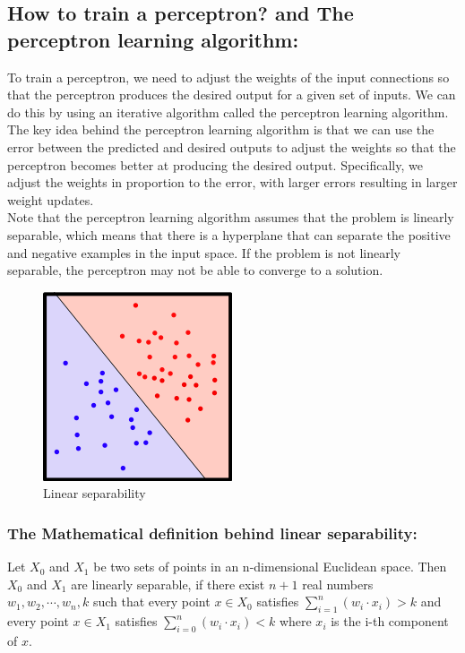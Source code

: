 \documentclass[12pt]{article}
\begin{document}
\subsection{How to train a perceptron? and The perceptron learning algorithm:}
To train a perceptron, we need to adjust the weights of the input connections so that the
perceptron produces the desired output for a given set of inputs. We can do this by using an
iterative algorithm called the perceptron learning algorithm.\\
The key idea behind the perceptron learning algorithm is that we can use the error between the
predicted and desired outputs to adjust the weights so that the perceptron becomes better at
producing the desired output. Specifically, we adjust the weights in proportion to the error, with
larger errors resulting in larger weight updates.\\
Note that the perceptron learning algorithm assumes that the problem is linearly separable, which
means that there is a hyperplane that can separate the positive and negative examples in the input
space. If the problem is not linearly separable, the perceptron may not be able to converge to a
solution.\\
\begin{figure}[h]
  \centering
  \includegraphics{linearly.png}
  \caption{Linear separability}
\end{figure}
\newpage
\subsubsection{The Mathematical definition behind linear separability:}
Let $X_0$ and $X_1$ be two sets of points in an n-dimensional Euclidean space. Then $X_0$ and $X_1$
are linearly separable, if there exist $n + 1$ real numbers $w_1, w_2, \cdots, w_n, k$ such that
every point $x \in X_0$ satisfies $\sum_{i = 1}^{n}(w_i \cdot x_i) > k$ and every point $x \in X_1$
satisfies
$\sum_{i = 0}^{n}(w_i \cdot x_i) < k$ where $x_i$ is the i-th component of $x$.
\end{document}
